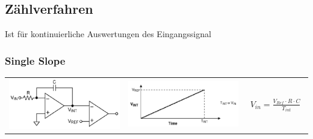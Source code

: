 \subsection{Zählverfahren } 
Ist für kontinuierliche Auswertungen des Eingangssignal
\subsubsection{Single Slope}

\begin{tabular}{ccp{4cm}}
  \includegraphics[width=6cm, valign=t]{pictures/singleSlope1} &
  \includegraphics[width=6cm, valign=t]{pictures/singleSlope2} &
  {\begin{align*}
    V_{in}=\frac{V_{Ref} \cdot R \cdot C}{T_{int}}
  \end{align*}} \\
\end{tabular}

